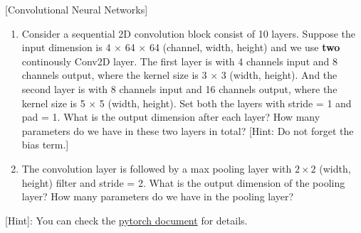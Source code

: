 \item {} [Convolutional Neural Networks]

\begin{enumerate}
    \item Consider a sequential 2D convolution block consist of 10 layers. Suppose the input dimension is 4 $\times$ 64 $\times$ 64 (channel, width, height) and we use \textbf{two} continously Conv2D layer. The first layer is with 4 channels input and 8 channels output, where the kernel size is 3 $\times$ 3 (width, height). And the second layer is with 8 channels input and 16 channels output, where the kernel size is 5 $\times$ 5 (width, height). Set both the layers with stride = 1 and pad = 1. What is the output dimension after each layer? How many parameters do we have in these two layers in total?  [Hint: Do not forget the bias term.]
    \item The convolution layer is followed by a max pooling layer with $2\times 2$ (width, height) filter and stride
    = 2. What is the output dimension of the pooling layer? How many parameters do we have in the pooling
    layer? 
\end{enumerate}

[Hint]: You can check the \href{https://pytorch.org/docs/stable/nn.html#convolution-layers}{pytorch document} for details.

\solution









\newpage